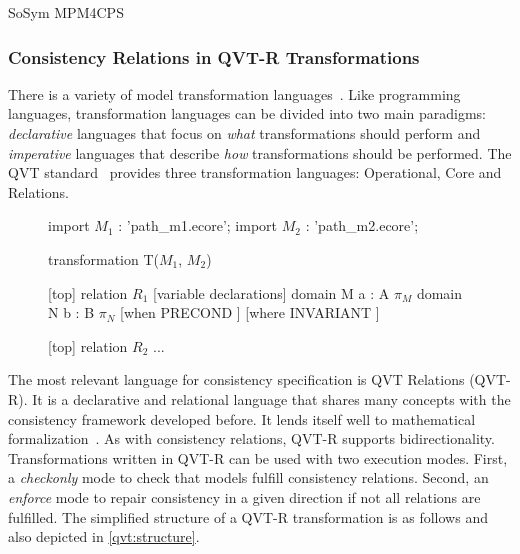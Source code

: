 \begin{copiedFrom}{SoSym MPM4CPS}
\subsubsection{Consistency Relations in QVT-R Transformations}

There is a variety of model transformation languages~\cite{czarnecki2003a}. Like programming languages, transformation languages can be divided into two main paradigms: \textit{declarative} languages that focus on \textit{what} transformations should perform and \textit{imperative} languages that describe \textit{how} transformations should be performed. The QVT standard~\cite{qvt} %
provides three transformation languages: Operational, Core and Relations.

\begin{figure}
\begin{embeddedqvtcode}[frame=bt, numbers=none, mathescape=true, caption={Simplified structure of a QVT-R transformation. Taken from \owncite{klare2020compatibility-report}.},label={qvt:structure},captionpos=b]
import $M_1$ : 'path_m1.ecore';
import $M_2$ : 'path_m2.ecore';

transformation T($M_1$, $M_2$) {
    [top] relation $R_1$ {
        [variable declarations]
        domain M a : A { $\pi_{M}$ }
        domain N b : B { $\pi_{N}$ }
        [when { PRECOND }] [where { INVARIANT }]
    }
    
    [top] relation $R_2$ { ... }
}
\end{embeddedqvtcode}
\end{figure}

The most relevant language for consistency specification is QVT Relations (QVT-R). It is a declarative and relational language that shares many concepts with the consistency framework developed before. It lends itself well to mathematical formalization~\cite{stevens2010sosym}. As with consistency relations, QVT-R supports bidirectionality. Transformations written in QVT-R can be used with two execution modes. First, a \textit{checkonly} mode to check that models fulfill consistency relations. Second, an \textit{enforce} mode to repair consistency in a given direction if not all relations are fulfilled. The simplified structure of a QVT-R transformation is as follows and also depicted in \autoref{qvt:structure}. 


\end{copiedFrom}
